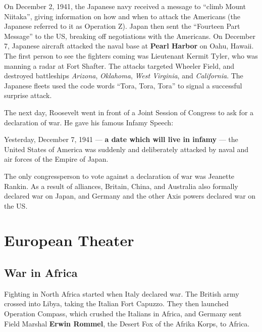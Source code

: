 On December 2, 1941, the Japanese navy received a message to ``climb Mount Niitaka'',
giving information on how and when to attack the Americans
(the Japanese referred to it as Operation Z).
Japan then sent the ``Fourteen Part Message'' to the US,
breaking off negotiations with the Americans.
On December 7,
Japanese aircraft attacked the naval base at \textbf{Pearl Harbor} on Oahu, Hawaii.
The first person to see the fighters coming was Lieutenant Kermit Tyler,
who was manning a radar at Fort Shafter.
The attacks targeted Wheeler Field, and destroyed battleships
\textit{Arizona},
\textit{Oklahoma},
\textit{West Virginia},
and \textit{California}.
The Japanese fleets used the code words ``Tora, Tora, Tora'' to signal a successful surprise attack.

The next day,
Roosevelt went in front of a Joint Session of Congress to ask for a declaration of war.
He gave his famous Infamy Speech:
\begin{quoting}
  Yesterday, December 7, 1941 --- \textbf{a date which will live in infamy} ---
  the United States of America
  was suddenly and deliberately attacked by naval and air forces of the Empire of Japan.
\end{quoting}
The only congressperson to vote against a declaration of war was Jeanette Rankin.
As a result of alliances, Britain, China, and Australia also formally declared war on Japan,
and Germany and the other Axis powers declared war on the US\@.

\section{European Theater}

\subsection*{War in Africa}

Fighting in North Africa started when Italy declared war.
The British army crossed into Libya, taking the Italian Fort Capuzzo.
They then launched Operation Compass, which crushed the Italians in Africa,
and Germany sent Field Marshal \textbf{Erwin Rommel}, the Desert Fox of the Afrika Korps, to Africa.

